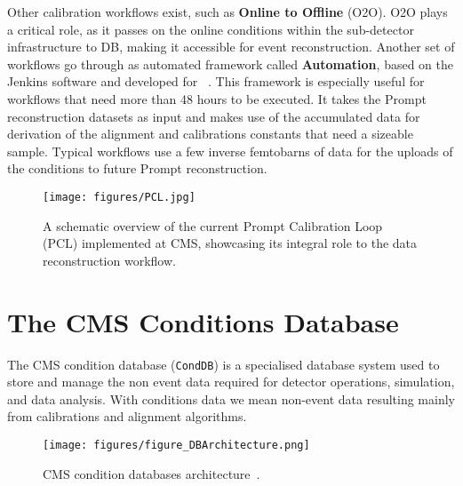 Other calibration workflows exist, such as \textbf{Online to Offline} (O2O). O2O plays a critical role, as it passes on the online conditions within the sub-detector infrastructure to DB, making it accessible for event reconstruction.
Another set of workflows go through as automated framework called \textbf{Automation},
based on the Jenkins software and developed for \Runthree~\cite{Pigazzini:2853679}.
This framework is especially useful for workflows that need more than 48 hours to be executed.
It takes the Prompt reconstruction datasets as input and makes use of the accumulated data for derivation of the alignment and calibrations constants that need a sizeable sample. Typical workflows use a few inverse femtobarns of data for the uploads of the conditions to future Prompt reconstruction.

\begin{figure}[h!]	
\centering
\texttt{[image: figures/PCL.jpg]} %
\caption{A schematic overview of the current Prompt Calibration Loop (PCL) implemented at CMS, showcasing its integral role to the data reconstruction workflow.} %
\label{fig:PCL}
\end{figure}


\section{The CMS Conditions Database} \label{sec:CMS_CondDB}
The CMS condition database (\texttt{CondDB}) is a specialised database system used to store and manage the non event data required for detector operations, simulation, and data analysis. With conditions data we mean non-event data resulting mainly from calibrations and alignment algorithms.

\begin{figure}[h!]	
\centering
\texttt{[image: figures/figure\_DBArchitecture.png]} %
\caption{CMS condition databases architecture~\cite{DeGruttola:2010gb}.}
\label{fig:CondDB}
\end{figure}

